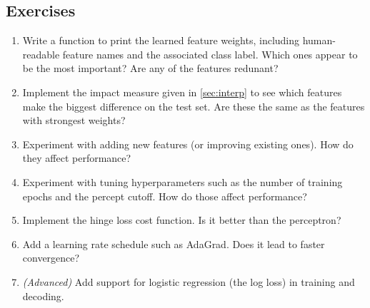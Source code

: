 \documentclass[11pt,letterpaper]{article}
\begin{document}
\subsection{Exercises}

\begin{enumerate}
  \item Write a function to print the learned feature weights, 
  including human-readable feature names and the associated class label.
  Which ones appear to be the most important?
  Are any of the features redunant?
  \item Implement the impact measure given in \cref{sec:interp} 
  to see which features make the biggest difference on the test set.
  Are these the same as the features with strongest weights?
  \item Experiment with adding new features (or improving existing ones).
  How do they affect performance?
  \item Experiment with tuning hyperparameters such as the number of training epochs
  and the percept cutoff. How do those affect performance?
  \item Implement the hinge loss cost function. Is it better than the perceptron?
  \item Add a learning rate schedule such as AdaGrad. Does it lead to faster convergence?
  \item {\em (Advanced)} Add support for logistic regression (the log loss) in training and decoding. 
\end{enumerate}





\end{document}
